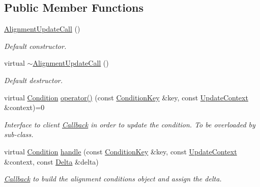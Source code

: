\subsection*{Public Member Functions}
\begin{DoxyCompactItemize}
\item 
\hyperlink{class_d_d4hep_1_1_alignments_1_1_alignment_update_call_ad19c943603062f89569a8341b139025f}{AlignmentUpdateCall} ()
\begin{DoxyCompactList}\small\item\em Default constructor. \item\end{DoxyCompactList}\item 
virtual \hyperlink{class_d_d4hep_1_1_alignments_1_1_alignment_update_call_a63a0be9ac654016954dcb1405954ac95}{$\sim$AlignmentUpdateCall} ()
\begin{DoxyCompactList}\small\item\em Default destructor. \item\end{DoxyCompactList}\item 
virtual \hyperlink{class_d_d4hep_1_1_conditions_1_1_condition}{Condition} \hyperlink{class_d_d4hep_1_1_alignments_1_1_alignment_update_call_a1180d2f8d62c0607b86c87853c7eeeb5}{operator()} (const \hyperlink{class_d_d4hep_1_1_conditions_1_1_condition_key}{ConditionKey} \&key, const \hyperlink{class_d_d4hep_1_1_conditions_1_1_condition_update_context}{UpdateContext} \&context)=0
\begin{DoxyCompactList}\small\item\em Interface to client \hyperlink{class_d_d4hep_1_1_callback}{Callback} in order to update the condition. To be overloaded by sub-\/class. \item\end{DoxyCompactList}\item 
virtual \hyperlink{class_d_d4hep_1_1_conditions_1_1_condition}{Condition} \hyperlink{class_d_d4hep_1_1_alignments_1_1_alignment_update_call_a5f99eaf1be2d8307eb53f54d570a5ab6}{handle} (const \hyperlink{class_d_d4hep_1_1_conditions_1_1_condition_key}{ConditionKey} \&key, const \hyperlink{class_d_d4hep_1_1_conditions_1_1_condition_update_context}{UpdateContext} \&context, const \hyperlink{class_d_d4hep_1_1_alignments_1_1_delta}{Delta} \&delta)
\begin{DoxyCompactList}\small\item\em \hyperlink{class_d_d4hep_1_1_callback}{Callback} to build the alignment conditions object and assign the delta. \item\end{DoxyCompactList}\end{DoxyCompactItemize}


